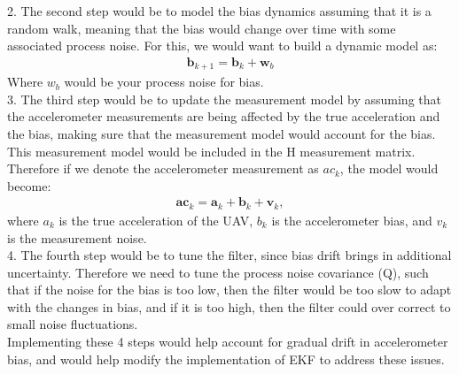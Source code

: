 2. The second step would be to model the bias dynamics assuming that it is a random walk, meaning that the bias would change over time with some associated process noise. For this, we would want to build a dynamic model as:
\begin{align*}
\mathbf{b}_{k+1} = \mathbf{b}_k + \mathbf{w}_b
\end{align*}
Where $w_b$ would be your process noise for bias.\\

3. The third step would be to update the measurement model by assuming that the accelerometer measurements are being affected by the true acceleration and the bias, making sure that the measurement model would account for the bias. This measurement model would be included in the H measurement matrix. Therefore if we denote the accelerometer measurement as $ac_k$, the model would become:
\begin{align*}
\mathbf{ac}_k = \mathbf{a}_k + \mathbf{b}_k + \mathbf{v}_k,
\end{align*}
where $a_k$ is the true acceleration of the UAV, $b_k$ is the accelerometer bias, and $v_k$ is the measurement noise.\\

4. The fourth step would be to tune the filter, since bias drift brings in additional uncertainty. Therefore we need to tune the process noise covariance (Q), such that if the noise for the bias is too low, then the filter would be too slow to adapt with the changes in bias, and if it is too high, then the filter could over correct to small noise fluctuations.\\

Implementing these 4 steps would help account for gradual drift in accelerometer bias, and would help modify the implementation of EKF to address these issues.

